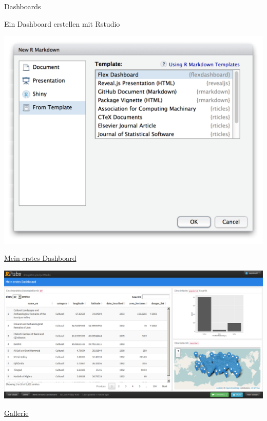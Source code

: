 \documentclass[ignorenonframetext,]{beamer}
\begin{document}
\begin{frame}[fragile]{Dashboards}
\begin{block}{Ein Dashboard erstellen mit Rstudio}

\includegraphics{./tex2pdf.9796/1d6c4b1dbda7c4e08d7718e5e92e2eed8ed2d9b3.png}

\end{block}

\begin{block}{\href{http://rpubs.com/Japhilko82/whcsites}{Mein erstes
Dashboard}}

\includegraphics{./tex2pdf.9796/b2191ce44fa49a14ff7c1242a1c783d05d49f0d5.png}

\end{block}

\begin{block}{\href{http://rmarkdown.rstudio.com/gallery.html}{Gallerie}}


\end{block}
\end{frame}
\end{document}
